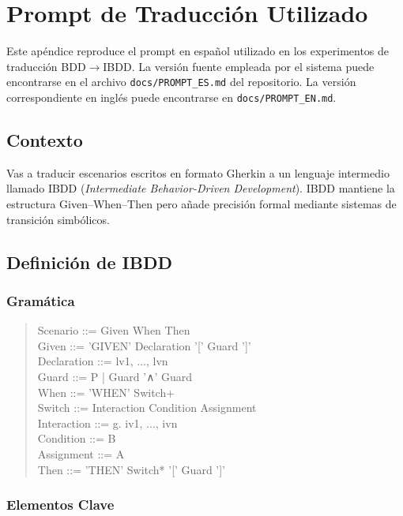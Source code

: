 \chapter{Prompt de Traducción Utilizado}
\label{ap:prompt}
\begingroup
{}

Este apéndice reproduce el prompt en español utilizado en los experimentos de traducción BDD$\rightarrow$IBDD. La versión fuente empleada por el sistema puede encontrarse en el archivo \texttt{docs/PROMPT\_ES.md} del repositorio. La versión correspondiente en inglés puede encontrarse en \texttt{docs/PROMPT\_EN.md}.

\section{Contexto}

Vas a traducir escenarios escritos en formato Gherkin a un lenguaje intermedio llamado IBDD (\textit{Intermediate Behavior-Driven Development}). IBDD mantiene la estructura Given--When--Then pero añade precisión formal mediante sistemas de transición simbólicos.

\section{Definición de IBDD}

\subsection{Gramática}

\begin{quote}
\ttfamily
Scenario ::= Given When Then\\
Given ::= 'GIVEN' Declaration '[' Guard ']'\\
Declaration ::= lv1, ..., lvn\\
Guard ::= P | Guard '∧' Guard\\
When ::= 'WHEN' Switch+\\
Switch ::= Interaction Condition Assignment\\
Interaction ::= g. iv1, ..., ivn\\
Condition ::= B\\
Assignment ::= A\\
Then ::= 'THEN' Switch* '[' Guard ']'
\end{quote}

\subsection{Elementos Clave}

